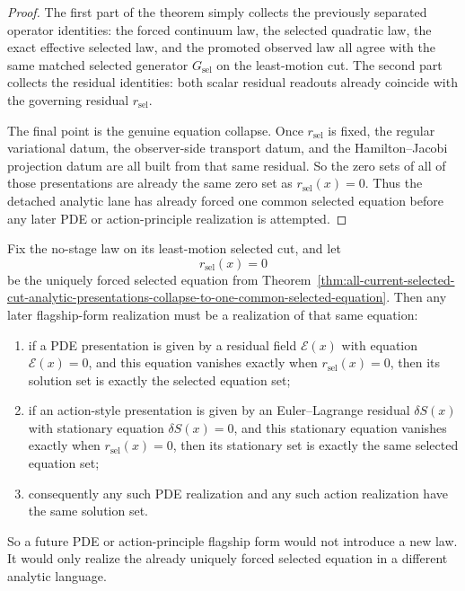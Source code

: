 \begin{proof}
The first part of the theorem simply collects the previously separated
operator identities: the forced continuum law, the selected quadratic law, the
exact effective selected law, and the promoted observed law all agree with the
same matched selected generator \(G_{\mathrm{sel}}\) on the least-motion cut.
The second part collects the residual identities: both scalar residual
readouts already coincide with the governing residual
\(r_{\mathrm{sel}}\).

The final point is the genuine equation collapse. Once \(r_{\mathrm{sel}}\) is
fixed, the regular variational datum, the observer-side transport datum, and
the Hamilton--Jacobi projection datum are all built from that same residual.
So the zero sets of all of those presentations are already the same zero set
as \(r_{\mathrm{sel}}(x)=0\). Thus the detached analytic lane has already
forced one common selected equation before any later PDE or action-principle
realization is attempted.
\end{proof}

\begin{theorem}
\label{thm:any-later-pde-or-action-principle-flagship-form-must-realize-the-same-selected-equation}
Fix the no-stage law on its least-motion selected cut, and let
\[
r_{\mathrm{sel}}(x)=0
\]
be the uniquely forced selected equation from
Theorem~\ref{thm:all-current-selected-cut-analytic-presentations-collapse-to-one-common-selected-equation}.
Then any later flagship-form realization must be a realization of that same
equation:
\begin{enumerate}
\item if a PDE presentation is given by a residual field
      \(\mathcal{E}(x)\) with equation \(\mathcal{E}(x)=0\), and this
      equation vanishes exactly when \(r_{\mathrm{sel}}(x)=0\), then its
      solution set is exactly the selected equation set;
\item if an action-style presentation is given by an Euler--Lagrange residual
      \(\delta S(x)\) with stationary equation \(\delta S(x)=0\), and this
      stationary equation vanishes exactly when \(r_{\mathrm{sel}}(x)=0\),
      then its stationary set is exactly the same selected equation set;
\item consequently any such PDE realization and any such action realization
      have the same solution set.
\end{enumerate}
So a future PDE or action-principle flagship form would not introduce a new
law. It would only realize the already uniquely forced selected equation in a
different analytic language.
\end{theorem}

